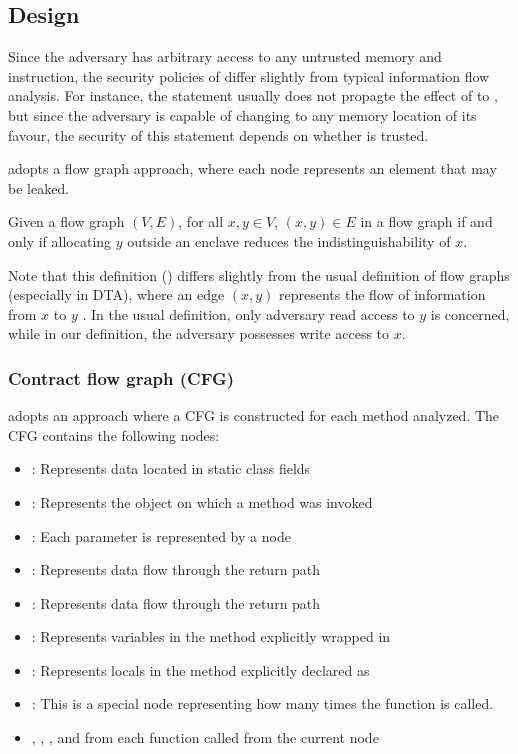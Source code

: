 \subsection{Design}
Since the adversary has arbitrary access to any untrusted memory and instruction,
the security policies of \pname{} differ slightly from typical information flow analysis.
For instance, the statement  usually
does not propagte the effect of  to ,
but since the adversary is capable of changing  to any memory location of its favour,
the security of this statement depends on whether  is trusted.

\pname{} adopts a flow graph approach,
where each node represents an element that may be leaked.

\begin{defin}
	Given a flow graph $(V, E)$, for all $x, y \in V$,
	$(x, y) \in E$ in a flow graph if and only if
	allocating $y$ outside an enclave reduces the indistinguishability of $x$.
\end{defin}

Note that this definition () differs slightly from
the usual definition of flow graphs (especially in DTA),
where an edge $(x, y)$ represents the flow of information from $x$ to $y$ \cite{YinHeng2007Pcsi}.
In the usual definition, only adversary read access to $y$ is concerned,
while in our definition, the adversary possesses write access to $x$.

\subsubsection{Contract flow graph (CFG)}
\pname{} adopts an approach where a CFG is constructed for each method analyzed.
The CFG contains the following nodes:
\begin{itemize}
	\item {}: Represents data located in static class fields
	\item {}: Represents the object on which a method was invoked
	\item {}: Each parameter is represented by a node
	\item {}: Represents data flow through the return path
	\item {}: Represents data flow through the return path
	\item {}: Represents variables in the method explicitly wrapped in 
	\item {}: Represents locals in the method explicitly declared as 
	\item {}: This is a special node representing how many times the function is called.
	\item {}, , ,  and 
		from each function called from the current node
\end{itemize}

